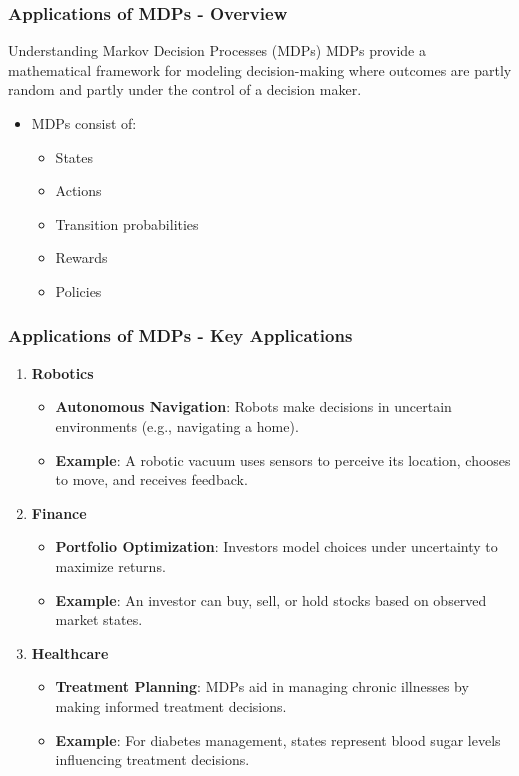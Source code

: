 \documentclass[aspectratio=169]{beamer}
\begin{document}
\begin{frame}[fragile]
    \frametitle{Applications of MDPs - Overview}
    \begin{block}{Understanding Markov Decision Processes (MDPs)}
        MDPs provide a mathematical framework for modeling decision-making where outcomes are partly random and partly under the control of a decision maker.
    \end{block}
    \begin{itemize}
        \item MDPs consist of:
        \begin{itemize}
            \item States
            \item Actions
            \item Transition probabilities
            \item Rewards
            \item Policies
        \end{itemize}
    \end{itemize}
\end{frame}

\begin{frame}[fragile]
    \frametitle{Applications of MDPs - Key Applications}
    \begin{enumerate}
        \item \textbf{Robotics}
        \begin{itemize}
            \item \textbf{Autonomous Navigation}: Robots make decisions in uncertain environments (e.g., navigating a home).
            \item \textbf{Example}: A robotic vacuum uses sensors to perceive its location, chooses to move, and receives feedback.
        \end{itemize}
        \item \textbf{Finance}
        \begin{itemize}
            \item \textbf{Portfolio Optimization}: Investors model choices under uncertainty to maximize returns.
            \item \textbf{Example}: An investor can buy, sell, or hold stocks based on observed market states.
        \end{itemize}
        \item \textbf{Healthcare}
        \begin{itemize}
            \item \textbf{Treatment Planning}: MDPs aid in managing chronic illnesses by making informed treatment decisions.
            \item \textbf{Example}: For diabetes management, states represent blood sugar levels influencing treatment decisions.
        \end{itemize}
    \end{enumerate}
\end{frame}
\end{document}
